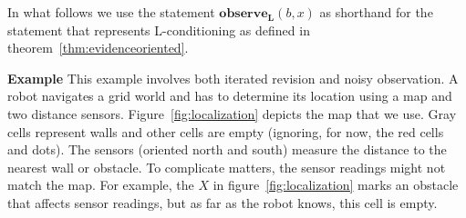 \documentclass{llncs}
\newcommand{\Rank}[1]{\hspace{3pt} \pmb{\langle} #1 \pmb{\rangle}\hspace{3pt} } %
\begin{document}
In what follows we use the statement $\textbf{observe}_{\textbf{L}}(b, x)$ as shorthand for the statement that represents L-conditioning as defined in theorem~\ref{thm:evidenceoriented}.

\textbf{Example} This example involves both iterated revision and noisy observation.
A robot navigates a grid world and has to determine its location using a map and two distance sensors.
Figure~\ref{fig:localization} depicts the map that we use.
Gray cells represent walls and other cells are empty (ignoring, for now, the red cells and dots).
The sensors (oriented north and south) measure the distance to the nearest wall or obstacle.
To complicate matters, the sensor readings might not match the map.
For example, the $X$ in figure~\ref{fig:localization} marks an obstacle that affects sensor readings, but as far as the robot knows, this cell is empty.
\end{document}
